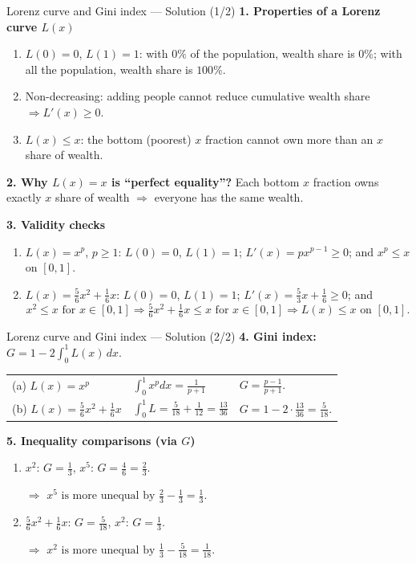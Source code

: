 \documentclass[9pt]{beamer}
\begin{document}
\begin{frame}{Lorenz curve and Gini index — Solution (1/2)}
\small
\textbf{1. Properties of a Lorenz curve $L(x)$}
\begin{enumerate}[leftmargin=0.5cm,label=(\alph*),rightmargin=0.2cm]
  \item $L(0)=0$, $L(1)=1$: with $0\%$ of the population, wealth share is $0\%$; with all the population, wealth share is $100\%$.
  \item Non-decreasing: adding people cannot reduce cumulative wealth share $\Rightarrow L'(x)\ge 0$.
  \item $L(x)\le x$: the bottom (poorest) $x$ fraction cannot own more than an $x$ share of wealth.
\end{enumerate}

\textbf{2. Why $L(x)=x$ is ``perfect equality''?} Each bottom $x$ fraction owns exactly $x$ share of wealth $\Rightarrow$ everyone has the same wealth.

\textbf{3. Validity checks}
\begin{enumerate}[leftmargin=0.5cm,label=(\alph*),rightmargin=0.2cm]
  \item $L(x)=x^p$, $p\ge1$: $L(0)=0$, $L(1)=1$; $L'(x)=p x^{p-1}\ge0$; and $x^p\le x$ on $[0,1]$.
  \item $L(x)=\frac{5}{6}x^2+\frac{1}{6}x$: $L(0)=0$, $L(1)=1$; $L'(x)=\frac{5}{3}x+\frac{1}{6}\ge0$; and
  \[
  x^2 \leq x \text{ for } x\in[0, 1] \Longrightarrow \tfrac{5}{6}x^2+\tfrac{1}{6}x\le x \text{ for } x\in[0, 1] \Longrightarrow L(x)\le x \text{ on } [0,1].
  \]
\end{enumerate}
\end{frame}

\begin{frame}{Lorenz curve and Gini index — Solution (2/2)}
\small
\textbf{4. Gini index:} \(\displaystyle G=1-2\int_0^1 L(x)\,dx\).

\medskip
\begin{tabular}{@{}l l l@{}}
(a) $L(x)=x^p$ & $\displaystyle \int_0^1 x^p dx=\frac{1}{p+1}$ & 
\(\displaystyle \boxed{G=\frac{p-1}{p+1}}\).\\[6pt]
(b) $L(x)=\frac{5}{6}x^2+\frac{1}{6}x$ & 
$\displaystyle \int_0^1 L=\frac{5}{18}+\frac{1}{12}=\frac{13}{36}$ &
\(\displaystyle \boxed{G=1-2\cdot\frac{13}{36}=\frac{5}{18}}\).
\end{tabular}

\medskip
\textbf{5. Inequality comparisons (via $G$)}
\begin{enumerate}[leftmargin=0.5cm,label=(\alph*),rightmargin=0.2cm]
  \item $x^2$: \(G=\frac{1}{3}\), \quad $x^5$: \(G=\frac{4}{6}=\frac{2}{3}\).
  
  \(\Rightarrow\) \(\boxed{x^5 \text{ is more unequal by } \frac{2}{3}-\frac{1}{3}=\frac{1}{3}}\).
  
  \item $\frac{5}{6}x^2+\frac{1}{6}x$: \(G=\frac{5}{18}\), \quad $x^2$: \(G=\frac{1}{3}\).
  
  \(\Rightarrow\) \(\boxed{x^2 \text{ is more unequal by } \frac{1}{3}-\frac{5}{18}=\frac{1}{18}}\).
\end{enumerate}
\end{frame}
\end{document}
